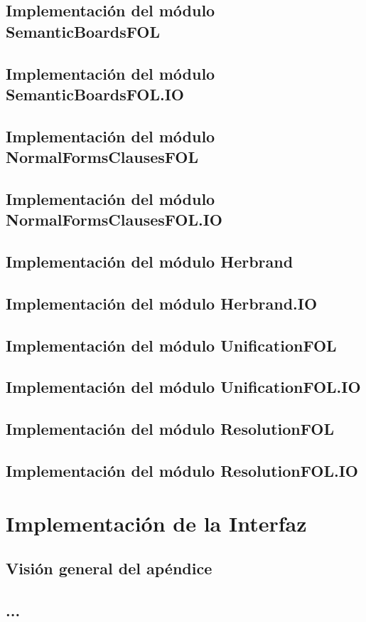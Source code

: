 \documentclass[fleqn, 11pt, a4paper]{book}
\begin{document}
\section{Implementación del módulo SemanticBoardsFOL}
\section{Implementación del módulo SemanticBoardsFOL.IO}
\section{Implementación del módulo NormalFormsClausesFOL}
\section{Implementación del módulo NormalFormsClausesFOL.IO}
\section{Implementación del módulo Herbrand}
\section{Implementación del módulo Herbrand.IO}
\section{Implementación del módulo UnificationFOL}
\section{Implementación del módulo UnificationFOL.IO}
\section{Implementación del módulo ResolutionFOL}
\section{Implementación del módulo ResolutionFOL.IO}

\chapter{Implementación de la Interfaz}
\section{Visión general del apéndice}
\section{...}
\end{document}
